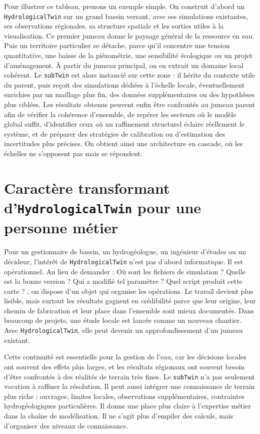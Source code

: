 \documentclass[11pt,a4paper]{article}
\newcommand{\hydrot}{\texttt{HydrologicalTwin}}
\newcommand{\subt}{\texttt{subTwin}}
\begin{document}
Pour illustrer ce tableau, prenons un exemple simple. On construit d'abord un \hydrot{} sur un grand bassin versant, avec ses simulations existantes, ses observations régionales, sa structure spatiale et les sorties utiles à la visualisation. Ce premier jumeau donne le paysage général de la ressource en eau. Puis un territoire particulier se détache, parce qu'il concentre une tension quantitative, une baisse de la piézométrie, une sensibilité écologique ou un projet d'aménagement. À partir du jumeau principal, on en extrait un domaine local cohérent. Le \subt{} est alors instancié sur cette zone : il hérite du contexte utile du parent, puis reçoit des simulations dédiées à l'échelle locale, éventuellement enrichies par un maillage plus fin, des données supplémentaires ou des hypothèses plus ciblées. Les résultats obtenus peuvent enfin être confrontés au jumeau parent afin de vérifier la cohérence d'ensemble, de repérer les secteurs où le modèle global suffit, d'identifier ceux où un raffinement structurel éclaire réellement le système, et de préparer des stratégies de calibration ou d'estimation des incertitudes plus précises. On obtient ainsi une architecture en cascade, où les échelles ne s'opposent pas mais se répondent.



\section{Caractère transformant d'\hydrot{} pour une personne métier}

Pour un gestionnaire de bassin, un hydrogéologue, un ingénieur d'études ou un décideur, l'intérêt de \hydrot{} n'est pas d'abord informatique. Il est opérationnel. Au lieu de demander : \og Où sont les fichiers de simulation ? Quelle est la bonne version ? Qui a modifié tel paramètre ? Quel script produit cette carte ? \fg{}, on dispose d'un objet qui organise les opérations. Le travail devient plus lisible, mais surtout les résultats gagnent en crédibilité parce que leur origine, leur chemin de fabrication et leur place dans l'ensemble sont mieux documentés. Dans beaucoup de projets, une étude locale est lancée comme un nouveau chantier. Avec \hydrot{}, elle peut devenir un approfondissement d'un jumeau existant.

Cette continuité est essentielle pour la gestion de l'eau, car les décisions locales ont souvent des effets plus larges, et les résultats régionaux ont souvent besoin d'être confrontés à des réalités de terrain très fines. Le \subt{} n'a pas seulement vocation à raffiner la résolution. Il peut aussi intégrer une connaissance de terrain plus riche : ouvrages, limites locales, observations supplémentaires, contraintes hydrogéologiques particulières. Il donne une place plus claire à l'expertise métier dans la chaîne de modélisation. Il ne s'agit plus d'empiler des calculs, mais d'organiser des niveaux de connaissance.
\end{document}
